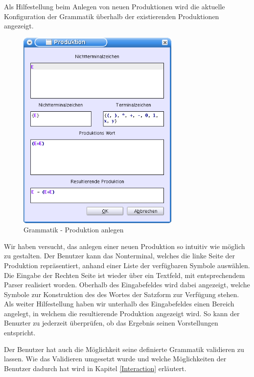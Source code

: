 Als Hilfestellung beim Anlegen von neuen Produktionen wird die aktuelle
Konfiguration der Grammatik überhalb der existierenden Produktionen
angezeigt.\vspace{10pt}

\begin{figure}[h!]
\begin{center}
\includegraphics[width=8cm]{../images/production_dialog.png}
\caption{Grammatik - Produktion anlegen}
\end{center}
\end{figure}
\vspace{10pt}

Wir haben versucht, das anlegen einer neuen Produktion so intuitiv wie möglich
zu gestalten. Der Benutzer kann das Nonterminal, welches die linke
Seite der Produktion repräsentiert, anhand einer Liste der
verfügbaren Symbole auswählen. Die Eingabe der Rechten Seite ist
wieder über ein Textfeld, mit entsprechendem Parser realisiert
worden. Oberhalb des Eingabefeldes wird dabei angezeigt, welche Symbole zur
Konstruktion des des Wortes der Satzform zur Verfügung stehen. Als weiter
Hilfestellung haben wir unterhalb des Eingabefeldes einen Bereich angelegt,
in welchem die resultierende Produktion angezeigt wird. So kann der
Benuzter zu jederzeit überprüfen, ob das Ergebnis seinen
Vorstellungen entspricht.\vspace{10pt}

Der Benutzer hat auch die Möglichkeit seine definierte Grammatik validieren zu
lassen. Wie das Validieren umgesetzt wurde und welche Möglichkeiten der
Benutzer dadurch hat wird in Kapitel \ref{Interaction} erläutert.\vspace{10pt}
